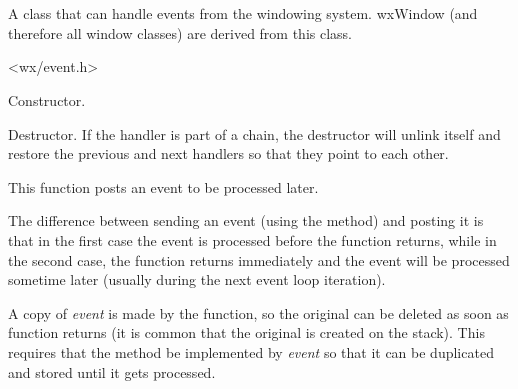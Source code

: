\section{}\label{wxevthandler}

A class that can handle events from the windowing system.
wxWindow (and therefore all window classes) are derived from
this class.




<wx/event.h>






Constructor.



Destructor. If the handler is part of a chain, the destructor will
unlink itself and restore the previous and next handlers so that they point to
each other.

\label{wxevthandleraddpendingevent}


This function posts an event to be processed later.




The difference between sending an event (using the
 method) and posting it is
that in the first case the event is processed before the function returns,
while in the second case, the function returns immediately and the event will
be processed sometime later (usually during the next event loop iteration).

A copy of {\it event} is made by the function, so the original can be deleted
as soon as function returns (it is common that the original is created on the
stack).  This requires that the  method
be implemented by {\it event} so that it can be duplicated and stored until
it gets processed.

